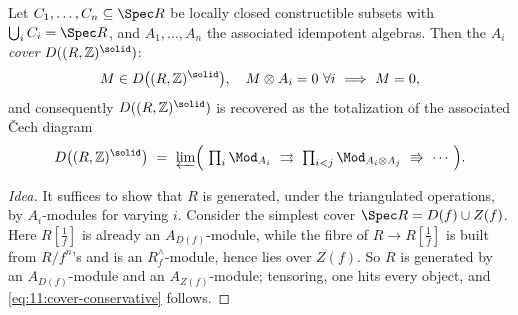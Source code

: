 \begin{proposition}
\label{prop:11:constructible-cover}
Let $C_{1},\dots,C_{n}\subseteq\Spec R$ be locally closed constructible subsets
with $\bigcup_{i}C_{i}=\Spec R$, and $A_{1},\dots,A_{n}$ the associated
idempotent algebras. Then the $A_{i}$ \emph{cover} $D((R,\mathbb{Z})^{\solid})$:
\begin{equation}
\label{eq:11:cover-conservative}
M\in D\bigl((R,\mathbb{Z})^{\solid}\bigr),\quad M\otimes A_{i}=0\ \forall i\
\Longrightarrow\ M=0,
\end{equation}
and consequently $D((R,\mathbb{Z})^{\solid})$ is recovered as the totalization
of the associated \v{C}ech diagram
\begin{equation*}
D\bigl((R,\mathbb{Z})^{\solid}\bigr)\ =\ \varprojlim\Bigl(\ \textstyle\prod_{i}
\Mod_{A_{i}}\ \rightrightarrows\ \prod_{i<j}\Mod_{A_{i}\otimes A_{j}}\
\Rrightarrow\ \cdots\ \Bigr).
\end{equation*}
\end{proposition}

\begin{proof}[Idea]
It suffices to show that $R$ is generated, under the triangulated operations, by
$A_{i}$-modules for varying $i$. Consider the simplest cover $\Spec R=D(f)\cup
Z(f)$. Here $R[\tfrac1f]$ is already an $A_{D(f)}$-module, while the fibre of
$R\to R[\tfrac1f]$ is built from $R/f^{n}$'s and is an
$R^{\wedge}_{f}$-module, hence lies over $Z(f)$. So $R$ is generated by an
$A_{D(f)}$-module and an $A_{Z(f)}$-module; tensoring, one hits every object,
and \eqref{eq:11:cover-conservative} follows.
\end{proof}

